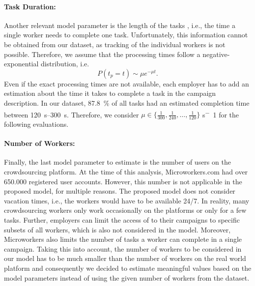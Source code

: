 \paragraph*{Task Duration: }Another relevant model parameter is the length of the tasks \taskDuration, i.e., the time a single worker needs to complete one task.
Unfortunately, this information cannot be obtained from our dataset, as tracking of the individual workers is not possible.
Therefore, we assume that the processing times follow a negative-exponential distribution, i.e.
\begin{equation*}
P(t_p=t) \sim \mu  e^{-{\mu}t}.
\end{equation*}
Even if the exact processing times are not available, each employer has to add an estimation about the time it takes to complete a task in the campaign description.
In our dataset, \SI{87.8}{\percent} of all tasks had an estimated completion time between \SIrange{120}{300}{\second}.
Therefore, we consider \(\mu \in \{\frac{1}{300},\frac{1}{240},\hdots,\frac{1}{120}\}\) \si{\second^-1} for the following evaluations.

\paragraph*{Number of Workers: }Finally, the last model parameter to estimate is the number of users \numberOfWorkers on the crowdsourcing platform.
At the time of this analysis, Microworkers.com had over 650.000 registered user accounts.
However, this number is not applicable in the proposed model, for multiple reasons.
The proposed model does not consider vacation times, i.e., the workers would have to be available 24/7.
In reality, many crowdsourcing workers only work occasionally on the platforms or only for a few tasks.
Further, employers can limit the access of to their campaigns to specific subsets of all workers, which is also not considered in the model.
Moreover, Microworkers also limits the number of tasks a worker can complete in a single campaign.
Taking this into account, the number of workers to be considered in our model has to be much smaller than the number of workers on the real world platform and consequently we decided to estimate meaningful values based on the model parameters instead of using the given number of workers from the dataset.


